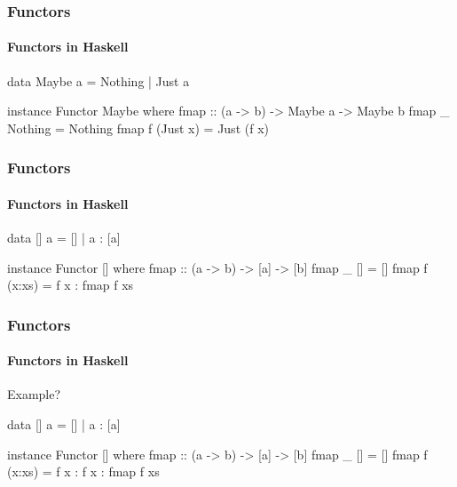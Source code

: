 \documentclass{beamer}
\begin{document}

\begin{frame}[fragile]
  \frametitle{Functors}
  \framesubtitle{Functors in Haskell}

  \begin{example}
    \begin{code}
data Maybe a = Nothing | Just a

instance Functor Maybe where
  fmap :: (a -> b) -> Maybe a -> Maybe b
  fmap _ Nothing  = Nothing
  fmap f (Just x) = Just (f x)
    \end{code}
  \end{example}

\end{frame}


\begin{frame}[fragile]
  \frametitle{Functors}
  \framesubtitle{Functors in Haskell}

  \begin{example}
    \begin{code}
data [] a = [] | a : [a]

instance Functor [] where
  fmap :: (a -> b) -> [a] -> [b]
  fmap _ []     = []
  fmap f (x:xs) = f x : fmap f xs
    \end{code}
  \end{example}

\end{frame}


\begin{frame}[fragile]
  \frametitle{Functors}
  \framesubtitle{Functors in Haskell}

  \begin{alertblock}{Example?}
    \begin{code}
data [] a = [] | a : [a]

instance Functor [] where
  fmap :: (a -> b) -> [a] -> [b]
  fmap _ []     = []
  fmap f (x:xs) = f x : f x : fmap f xs
    \end{code}
  \end{alertblock}

\end{frame}

\end{document}
